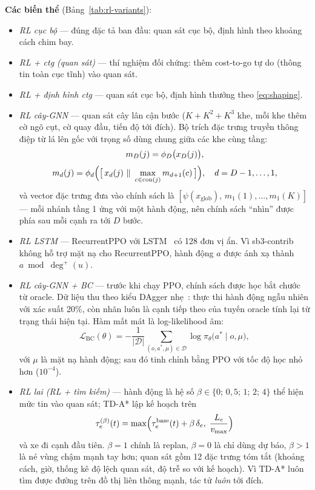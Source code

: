 \textbf{Các biến thể} (Bảng~\ref{tab:rl-variants}):
\begin{itemize}
    \item \emph{RL cục bộ} --- đúng đặc tả ban đầu: quan sát cục bộ, định hình theo khoảng cách chim bay.
    \item \emph{RL + ctg (quan sát)} --- thí nghiệm đối chứng: thêm cost-to-go tự do (thông tin toàn cục tĩnh) vào quan sát.
    \item \emph{RL + định hình ctg} --- quan sát cục bộ, định hình thưởng theo \eqref{eq:shaping}.
    \item \emph{RL cây-GNN} --- quan sát cây lân cận \TreeDepth{} bước ($K+K^2+K^3$ khe, mỗi khe thêm cờ ngõ cụt, cờ quay đầu,
    tiến độ tới đích). Bộ trích đặc trưng truyền thông điệp từ lá lên gốc với trọng số dùng chung giữa các khe cùng tầng:
    \begin{equation}
    \begin{gathered}
    m_D(j) = \phi_D\bigl(x_D(j)\bigr),\\[1mm]
    m_d(j) = \phi_d\Bigl(\bigl[\,x_d(j)\ \|\ \max_{c\in\text{con}(j)} m_{d+1}(c)\,\bigr]\Bigr),\quad d=D-1,\dots,1,
    \end{gathered}
    \label{eq:tree-gnn}
    \end{equation}
    và vector đặc trưng đưa vào chính sách là $[\psi(x_{\text{glob}}),\, m_1(1),\dots,m_1(K)]$ --- mỗi nhánh tầng 1 ứng với
    một hành động, nên chính sách ``nhìn'' được phía sau mỗi cạnh ra tới $D$ bước.
    \item \emph{RL LSTM} --- RecurrentPPO với LSTM~\cite{hochreiter1997lstm} có 128 đơn vị ẩn. Vì sb3-contrib không hỗ trợ mặt nạ
    cho RecurrentPPO, hành động $a$ được ánh xạ thành $a \bmod \deg^+(u)$.
    \item \emph{RL cây-GNN + BC} --- trước khi chạy PPO, chính sách được học bắt chước từ oracle. Dữ liệu thu theo kiểu DAgger
    nhẹ~\cite{ross2011dagger}: thực thi hành động ngẫu nhiên với xác suất 20\%, còn nhãn luôn là cạnh tiếp theo của tuyến
    oracle tính lại từ trạng thái hiện tại. Hàm mất mát là log-likelihood âm:
    \begin{equation}
    \mathcal{L}_{\text{BC}}(\theta) = -\frac{1}{|\mathcal{D}|}\sum_{(o,a^\ast,\mu)\in\mathcal{D}} \log \pi_\theta\bigl(a^\ast\mid o,\mu\bigr),
    \label{eq:bc}
    \end{equation}
    với $\mu$ là mặt nạ hành động; sau đó tinh chỉnh bằng PPO với tốc độ học nhỏ hơn ($10^{-4}$).
    \item \emph{RL lai (RL + tìm kiếm)} --- hành động là hệ số $\beta\in\{0;\,0{,}5;\,1;\,2;\,4\}$ thể hiện mức tin vào quan sát;
    TD-A* lập kế hoạch trên
    \begin{equation}
    \tau^{(\beta)}_e(t) = \max\Bigl(\tau^{\text{base}}_e(t) + \beta\,\delta_e,\; \frac{L_e}{v_{\max}}\Bigr)
    \label{eq:hybrid}
    \end{equation}
    và xe đi cạnh đầu tiên. $\beta=1$ chính là replan, $\beta=0$ là chỉ dùng dự báo, $\beta>1$ là né vùng chậm mạnh tay hơn;
    quan sát gồm 12 đặc trưng tóm tắt (khoảng cách, giờ, thống kê độ lệch quan sát, độ trễ so với kế hoạch). Vì TD-A* luôn
    tìm được đường trên đồ thị liên thông mạnh, tác tử \emph{luôn} tới đích.
\end{itemize}

